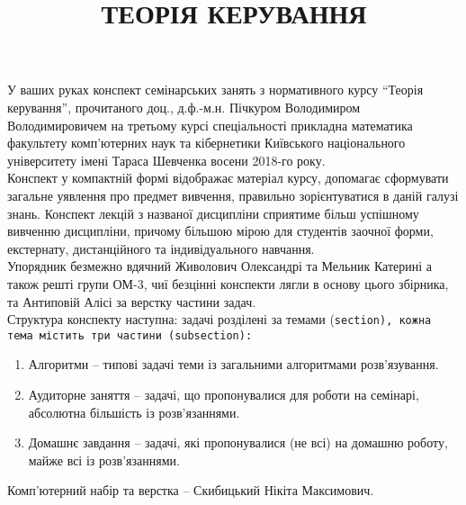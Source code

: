 \documentclass[a5paper, 10pt]{article}
\title{{\Huge ТЕОРІЯ КЕРУВАННЯ}}
\date{}
\theoremstyle{definition}
\numberwithin{equation}{section}
\begin{document}
\maketitle \thispagestyle{empty} \newpage 

У ваших руках конспект семінарських занять з нормативного курсу ``Теорія керування'', прочитаного доц., д.ф.-м.н. Пічкуром Володимиром Володимировичем на третьому курсі спеціальності прикладна математика факультету комп\-'ю\-тер\-них наук та кібернетики Київського національного університету імені Тараса Шевченка восени 2018-го року. \\

Конспект у компактній формі відображає матеріал курсу, допомагає сформувати загальне уявлення про предмет вивчення, правильно зорієнтуватися в даній галузі знань. Конспект лекцій з названої дисципліни сприятиме більш успішному вивченню дисципліни, причому більшою мірою для студентів заочної форми, екстернату, дистанційного та індивідуального навчання. \\

Упорядник безмежно вдячний Живолович Олександрі та Мельник Катерині а також решті групи ОМ-3, чиї безцінні конспекти лягли в основу цього збірника, та Антиповій Алісі за верстку частини задач. \\

Структура конспекту наступна: задачі розділені за темами (\tt{section}\normalfont), кожна тема містить три частини (\tt{subsection}\normalfont): 
\begin{enumerate}
	\item Алгоритми -- типові задачі теми із загальними алгоритмами розв'язування.
	\item Аудиторне заняття -- задачі, що пропонувалися для роботи на семінарі, абсолютна більшість із розв'язаннями.
	\item Домашнє завдання -- задачі, які пропонувалися (не всі) на домашню роботу, майже всі із розв'язаннями.
\end{enumerate}

Комп\-'ю\-тер\-ний набір та верстка -- Скибицький Нікіта Максимович.

\newpage

\tableofcontents \newpage

 \newpage
 \newpage
 \newpage

 \newpage
 \newpage
 \newpage

 \newpage
 \newpage
 \newpage
\end{document}
